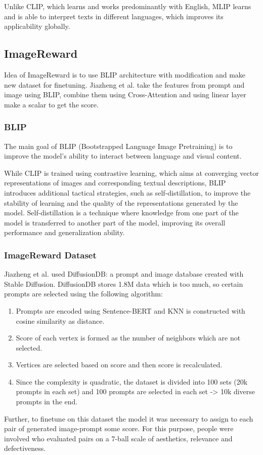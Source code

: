 Unlike CLIP, which learns and works predominantly with English, MLIP learns and is able to interpret texts in different languages, which improves its applicability globally.
\subsection{ImageReward}
Idea of ImageReward\cite{Image_reward} is to use BLIP architecture with modification and make new dataset for finetuning. Jiazheng et al.\cite{Image_reward} take the features from prompt and image using BLIP, combine them using Cross-Attention and using linear layer make a scalar to get the score.
\subsubsection{BLIP}
The main goal of BLIP (Bootstrapped Language Image Pretraining) is to improve the model's ability to interact between language and visual content.


While CLIP is trained using contrastive learning, which aims at converging vector representations of images and corresponding textual descriptions, BLIP introduces additional tactical strategies, such as self-distillation, to improve the stability of learning and the quality of the representations generated by the model. Self-distillation is a technique where knowledge from one part of the model is transferred to another part of the model, improving its overall performance and generalization ability.
\subsubsection{ImageReward Dataset}
Jiazheng et al. used DiffusionDB: a prompt and image database created with Stable Diffusion. DiffusionDB stores 1.8M data which is too much, so certain prompts are selected using the following algorithm:
\begin{enumerate}
    \item Prompts are encoded using Sentence-BERT and KNN is constructed with cosine similarity as distance.
    \item Score of each vertex is formed as the number of neighbors which are not selected.
    \item Vertices are selected based on score and then score is recalculated.
    \item Since the complexity is quadratic, the dataset is divided into 100 sets (20k prompts in each set) and 100 prompts are selected in each set -> 10k diverse prompts in the end.
\end{enumerate}
Further, to finetune on this dataset the model it was necessary to assign to each pair of generated image-prompt some score. For this purpose, people were involved who evaluated pairs on a 7-ball scale of aesthetics, relevance and defectiveness.

